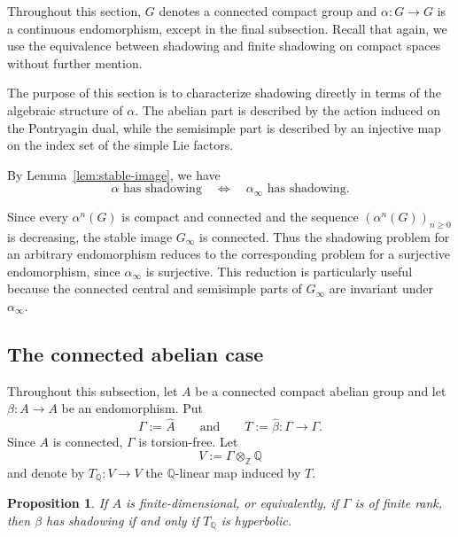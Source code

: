 \documentclass[12pt]{amsart}
\newtheorem{proposition}[theorem]{Proposition}
\theoremstyle{definition}
\numberwithin{equation}{section}
\theoremstyle{remark}
\begin{document}
Throughout this section, $G$ denotes a connected compact
group and $\alpha:G\to G$ is a continuous endomorphism, except in the final subsection. Recall that again, we use the
equivalence between shadowing and finite shadowing on compact spaces
without further mention.

The purpose of this section is to characterize shadowing directly in
terms of the algebraic structure of $\alpha$. The abelian part is
described by the action induced on the Pontryagin dual, while the
semisimple part is described by an injective map on the index set of
the simple Lie factors.


By Lemma~\ref{lem:stable-image}, we have
\begin{equation}\label{eq:stable-image-equiv}
\alpha\text{ has shadowing}
\quad\Longleftrightarrow\quad
\alpha_\infty\text{ has shadowing}.
\end{equation}

Since every $\alpha^n(G)$ is compact and connected and the sequence
$(\alpha^n(G))_{n\geq0}$ is decreasing, the stable image $G_\infty$
is connected.
Thus the shadowing problem for an arbitrary endomorphism reduces to
the corresponding problem for a surjective endomorphism, since $\alpha_\infty$ is surjective. This
reduction is particularly useful because the connected central and
semisimple parts of $G_\infty$ are invariant under
$\alpha_\infty$.

\subsection{The connected abelian case}
Throughout this subsection, let $A$ be a connected compact abelian group and let
$\beta:A\to A$ be an endomorphism. Put
\[
\Gamma:=\widehat A
\qquad\text{and}\qquad
T:=\widehat\beta:\Gamma\to\Gamma.
\]
Since $A$ is connected, $\Gamma$ is torsion-free. Let
\[
V:=\Gamma\otimes_{\mathbb Z}\mathbb Q
\]
and denote by $T_{\mathbb Q}:V\to V$ the $\mathbb Q$-linear map induced by $T$.



\begin{proposition}\label{prop:finite-dim}
If $A$ is finite-dimensional, or equivalently, if $\Gamma$ is of
finite rank, then $\beta$ has shadowing if and only if
$T_{\mathbb Q}$ is hyperbolic.
\end{proposition}
\end{document}
